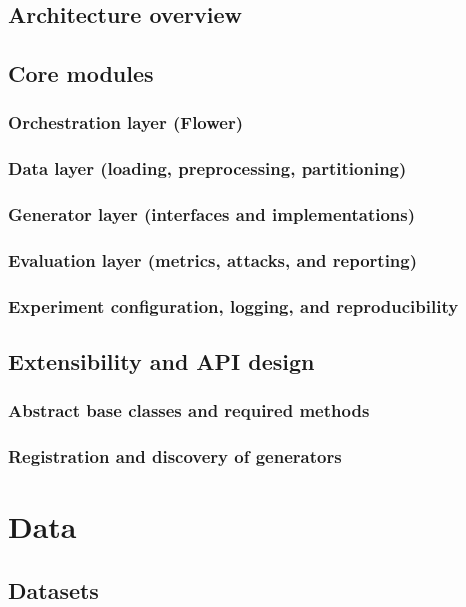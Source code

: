 \documentclass{article}
\begin{document}
\subsection{Architecture overview}

\subsection{Core modules}
\subsubsection{Orchestration layer (Flower)}
\subsubsection{Data layer (loading, preprocessing, partitioning)}
\subsubsection{Generator layer (interfaces and implementations)}
\subsubsection{Evaluation layer (metrics, attacks, and reporting)}
\subsubsection{Experiment configuration, logging, and reproducibility}

\subsection{Extensibility and API design}
\subsubsection{Abstract base classes and required methods}
\subsubsection{Registration and discovery of generators}

\section{Data}

\subsection{Datasets}
\end{document}
